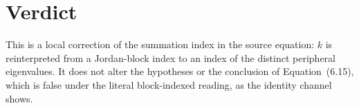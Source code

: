 \documentclass{article}
\begin{document}
\section{Verdict}

This is a local correction of the summation index in the source equation: $k$
is reinterpreted from a Jordan-block index to an index of the distinct
peripheral eigenvalues. It does not alter the hypotheses or the conclusion of
Equation~(6.15), which is false under the literal block-indexed reading, as
the identity channel shows.



\end{document}
